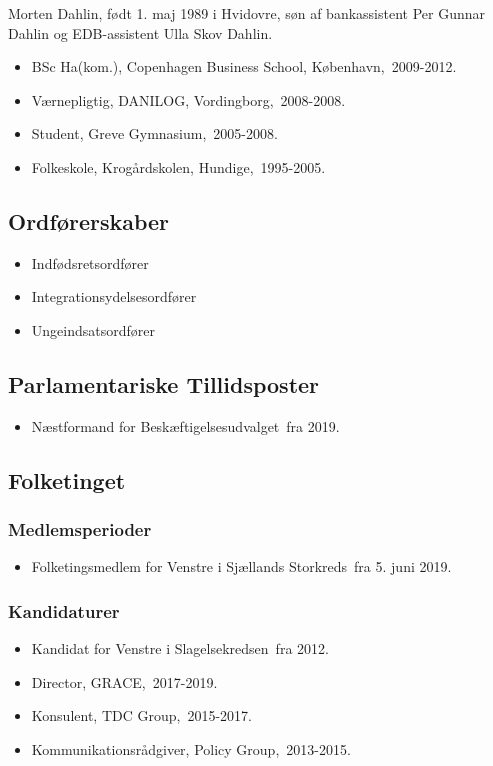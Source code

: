 \documentclass[11pt, a4paper]{awesome-cv}
\begin{document}
\makecvheader[R]
\makelettertitle
\begin{cvletter}
Morten Dahlin, født 1. maj 1989 i Hvidovre, søn af bankassistent Per Gunnar Dahlin og EDB-assistent Ulla Skov Dahlin.

\begin{itemize}
\item BSc Ha(kom.), Copenhagen Business School, København, 2009-2012.
\item Værnepligtig, DANILOG, Vordingborg, 2008-2008.
\item Student, Greve Gymnasium, 2005-2008.
\item Folkeskole, Krogårdskolen, Hundige, 1995-2005.
\end{itemize}
\subsection*{Ordførerskaber}
\begin{itemize}
\item Indfødsretsordfører
\item Integrationsydelsesordfører
\item Ungeindsatsordfører
\end{itemize}
\subsection*{Parlamentariske Tillidsposter}
\begin{itemize}
\item Næstformand for Beskæftigelsesudvalget fra 2019.
\end{itemize}
\subsection*{Folketinget}
\subsubsection*{Medlemsperioder}
\begin{itemize}
\item Folketingsmedlem for Venstre i Sjællands Storkreds fra 5. juni 2019.
\end{itemize}
\subsubsection*{Kandidaturer}
\begin{itemize}
\item Kandidat for Venstre i Slagelsekredsen fra 2012.
\end{itemize}
\begin{itemize}
\item Director, GRACE, 2017-2019.
\item Konsulent, TDC Group, 2015-2017.
\item Kommunikationsrådgiver, Policy Group, 2013-2015.
\end{itemize}
\end{cvletter}
\end{document}
